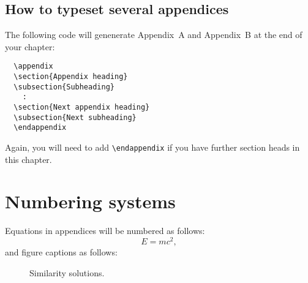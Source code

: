 \subsection{How to typeset several appendices}
The following code will genenerate Appendix~A and Appendix~B at the end of your chapter:
\begin{verbatim}
  \appendix
  \section{Appendix heading}
  \subsection{Subheading}
    :
  \section{Next appendix heading}
  \subsection{Next subheading}
  \endappendix
\end{verbatim}
Again, you will need to add \verb"\endappendix" if you have further section heads in this chapter.

\section{Numbering systems}

Equations in appendices will be numbered as follows:
\begin{equation}
  E=mc^2,
\end{equation}
and figure captions as follows:
\begin{figure}[h]
\caption[Similarity solutions]{Similarity solutions.}
\end{figure}

\endinput